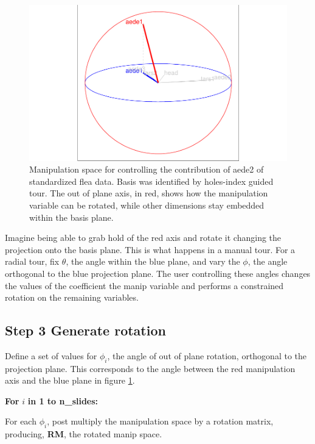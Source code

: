 \documentclass{monashthesis}
\begin{document}
\begin{figure}

{\centering \includegraphics[width=1\linewidth]{thesis_files/figure-latex/step2-1} 

}

\caption{Manipulation space for controlling the contribution of aede2 of standardized flea data. Basis was identified by holes-index guided tour. The out of plane axis, in red, shows how the manipulation variable can be rotated, while other dimensions stay embedded within the basis plane.}\label{fig:step2}
\end{figure}

Imagine being able to grab hold of the red axis and rotate it changing
the projection onto the basis plane. This is what happens in a manual
tour. For a radial tour, fix \(\theta\), the angle within the blue
plane, and vary the \(\phi\), the angle orthogonal to the blue
projection plane. The user controlling these angles changes the values
of the coefficient the manip variable and performs a constrained
rotation on the remaining variables.

\subsection{Step 3 Generate rotation}\label{step-3-generate-rotation}

Define a set of values for \(\phi_i\), the angle of out of plane
rotation, orthogonal to the projection plane. This corresponds to the
angle between the red manipulation axis and the blue plane in figure
\ref{fig:step2}.

\textbf{For } \(i\) \textbf{in 1 to n\_slides:}

For each \(\phi_i\), post multiply the manipulation space by a rotation
matrix, producing, \textbf{RM}, the rotated manip space.
\end{document}
